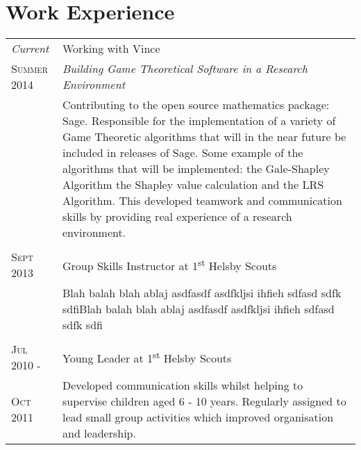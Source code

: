 \documentclass[a4paper, 11pt]{article}
\begin{document}
\section{Work Experience}
\begin{tabularx}{\textwidth}{lX}

\emph{Current} & Working with Vince \\
\textsc{Summer 2014} & \emph{Building Game Theoretical Software in a Research Environment}\\
& \footnotesize{Contributing to the open source mathematics package: Sage. Responsible for the implementation of a variety of Game Theoretic algorithms that will in the near future be included in releases of Sage. Some example of the algorithms that will be implemented: the Gale-Shapley Algorithm the Shapley value calculation and the LRS Algorithm. This developed teamwork and communication skills by providing real experience of a research environment.}\\
\\
\textsc{Sept 2013} & Group Skills Instructor at 1\textsuperscript{st} Helsby Scouts\\
& \footnotesize{Blah balah blah ablaj asdfasdf asdfkljsi ihfieh sdfasd sdfk sdfiBlah balah blah ablaj asdfasdf asdfkljsi ihfieh sdfasd sdfk sdfi}\\
\\
\textsc{Jul 2010 -} & Young Leader at 1\textsuperscript{st} Helsby Scouts\\
\textsc{Oct 2011}& \footnotesize{Developed communication skills whilst helping to supervise children aged 6 - 10 years. Regularly assigned to lead small group activities which improved organisation and leadership.}\\

\end{tabularx}
\end{document}
